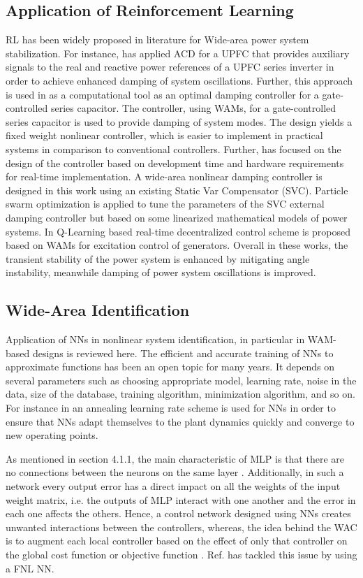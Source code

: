 \documentclass[journal]{IEEEtran}
\begin{document}
\subsection{Application of Reinforcement Learning}
RL has been widely proposed in literature for Wide-area power system stabilization. For instance, \cite{4596095} has applied ACD for a UPFC that provides auxiliary signals to the real and reactive power references of a UPFC series inverter in order to achieve enhanced damping of system oscillations. Further, this approach is used in \cite{4493402} as a computational tool as an optimal damping controller for a gate-controlled series capacitor. The controller, using WAMs, for a gate-controlled series capacitor is used to provide damping of system modes. The design yields a fixed weight nonlinear controller, which is easier to implement in practical systems in comparison to conventional controllers. Further, \cite{4596659} has focused on the design of the controller based on development time and hardware requirements for real-time implementation. A wide-area nonlinear damping controller is designed in this work using an existing Static Var Compensator (SVC). Particle swarm optimization is applied to tune the parameters of the SVC external damping controller but based on some linearized mathematical models of power systems. In \cite{6070201} Q-Learning based real-time decentralized control scheme is proposed based on WAMs for excitation control of generators. Overall in these works, the transient stability of the power system is enhanced by mitigating angle instability, meanwhile damping of power system oscillations is improved.

\subsection{Wide-Area Identification}
Application of NNs in nonlinear system identification, in particular in WAM-based designs is reviewed here. The efficient and accurate training of NNs to approximate functions has been an open topic for many years. It depends on several parameters such as choosing appropriate model, learning rate, noise in the data, size of the database, training algorithm, minimization algorithm, and so on. For instance in \cite{4162611} an annealing learning rate scheme is used for NNs in order to ensure that NNs adapt themselves to the plant dynamics quickly and converge to new operating points.

As mentioned in section 4.1.1, the main characteristic of MLP is that there are no connections between the neurons on the same layer \cite{webbb}. Additionally, in such a network every output error has a direct impact on all the weights of the input weight matrix, i.e. the outputs of MLP interact with one another and the error in each one affects the others. Hence, a control network designed using NNs creates unwanted interactions between the controllers, whereas, the idea behind the WAC is to augment each local controller based on the effect of only that controller on the global cost function or objective function \cite{4162611}. Ref. \cite{4162611} has tackled this issue by using a FNL NN. 
 
\end{document}
